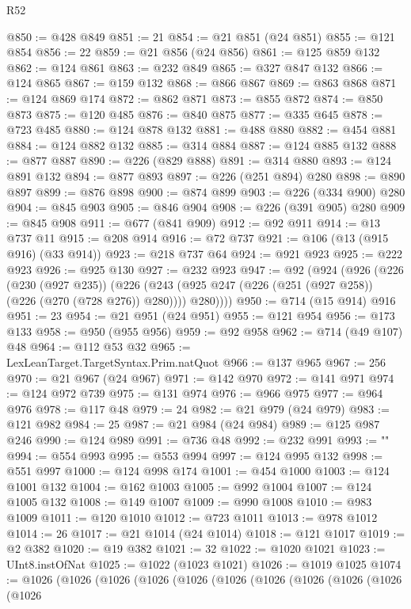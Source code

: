\begin{lexlean}{R52}
\begin{coremodule}
@850 := @428 @849
@851 := 21
@854 := @21 @851 (@24 @851)
@855 := @121 @854
@856 := 22
@859 := @21 @856 (@24 @856)
@861 := @125 @859 @132
@862 := @124 @861
@863 := @232 @849
@865 := @327 @847 @132
@866 := @124 @865
@867 := @159 @132
@868 := @866 @867
@869 := @863 @868
@871 := @124 @869 @174
@872 := @862 @871
@873 := @855 @872
@874 := @850 @873
@875 := @120 @485
@876 := @840 @875
@877 := @335 @645
@878 := @723 @485
@880 := @124 @878 @132
@881 := @488 @880
@882 := @454 @881
@884 := @124 @882 @132
@885 := @314 @884
@887 := @124 @885 @132
@888 := @877 @887
@890 := @226 (@829 @888)
@891 := @314 @880
@893 := @124 @891 @132
@894 := @877 @893
@897 := @226 (@251 @894) @280
@898 := @890 @897
@899 := @876 @898
@900 := @874 @899
@903 := @226 (@334 @900) @280
@904 := @845 @903
@905 := @846 @904
@908 := @226 (@391 @905) @280
@909 := @845 @908
@911 := @677 (@841 @909)
@912 := @92 @911
@914 := @13 @737 @11
@915 := @208 @914
@916 := @72 @737
@921 := @106 (@13 (@915 @916) (@33 @914))
@923 := @218 @737 @64
@924 := @921 @923
@925 := @222 @923
@926 := @925 @130
@927 := @232 @923
@947 := @92
    (@924
      (@926
        (@226
          (@230 (@927 @235))
          (@226 (@243 (@925 @247 (@226 (@251 (@927 @258)) (@226 (@270 (@728 @276)) @280)))) @280))))
@950 := @714 (@15 @914) @916
@951 := 23
@954 := @21 @951 (@24 @951)
@955 := @121 @954
@956 := @173 @133
@958 := @950 (@955 @956)
@959 := @92 @958
@962 := @714 (@49 @107) @48
@964 := @112 @53 @32
@965 := LexLeanTarget.TargetSyntax.Prim.natQuot
@966 := @137 @965
@967 := 256
@970 := @21 @967 (@24 @967)
@971 := @142 @970
@972 := @141 @971
@974 := @124 @972 @739
@975 := @131 @974
@976 := @966 @975
@977 := @964 @976
@978 := @117 @48
@979 := 24
@982 := @21 @979 (@24 @979)
@983 := @121 @982
@984 := 25
@987 := @21 @984 (@24 @984)
@989 := @125 @987 @246
@990 := @124 @989
@991 := @736 @48
@992 := @232 @991
@993 := "\n"
@994 := @554 @993
@995 := @553 @994
@997 := @124 @995 @132
@998 := @551 @997
@1000 := @124 @998 @174
@1001 := @454 @1000
@1003 := @124 @1001 @132
@1004 := @162 @1003
@1005 := @992 @1004
@1007 := @124 @1005 @132
@1008 := @149 @1007
@1009 := @990 @1008
@1010 := @983 @1009
@1011 := @120 @1010
@1012 := @723 @1011
@1013 := @978 @1012
@1014 := 26
@1017 := @21 @1014 (@24 @1014)
@1018 := @121 @1017
@1019 := @2 @382
@1020 := @19 @382
@1021 := 32
@1022 := @1020 @1021
@1023 := UInt8.instOfNat
@1025 := @1022 (@1023 @1021)
@1026 := @1019 @1025
@1074 := @1026
    (@1026
      (@1026
        (@1026
          (@1026
            (@1026
              (@1026
                (@1026
                  (@1026
                    (@1026
                      (@1026

\end{coremodule}
\end{lexlean}

